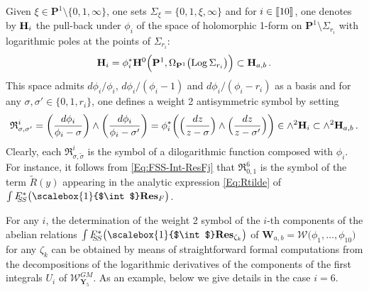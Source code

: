 \documentclass[11pt]{amsart}
\newcommand{\sk}{\smallskip}
\newcommand{\mk}{\medskip}
\begin{document}
Given $\xi\in \mathbf P^1\setminus \{0,1,\infty\}$, one sets $\Sigma_{\xi}=\{0,1,\xi,\infty\}$ and for $i\in  [\hspace{-0.05cm}[ 10  ]\hspace{-0.05cm}]$, 
one denotes by ${\bf H}_{i}$ the pull-back under $\phi_i$ of the space of holomorphic 1-form on $\mathbf P^1\setminus\Sigma_{r_i}$ with logarithmic poles at the points of $\Sigma_{r_i}$: 
$$
{\bf H}_{i}=\phi_i^* 
{\bf H}^0\Big( \mathbf P^1, \Omega_{ \mathbf P^1}\big( {\rm Log}\,\Sigma_{r_i}
 \big) \Big)\subset {\bf H}_{a,b}\, . 
 $$
This space admits ${d\phi_i}/{\phi_i}$, ${d\phi_i}/({\phi_i}-1)$ and 
${d\phi_i}/({\phi_i}-r_i)$ as a basis and for any  $\sigma, \sigma' \in  \{0,1,r_i\} $, one defines a  weight 2 antisymmetric symbol by setting
$$
{\mathfrak R}^i_{\sigma, \sigma'}= \bigg( \frac{d\phi_i}{\phi_i-\sigma}\bigg) \wedge 
\bigg( \frac{d\phi_i}{\phi_i- \sigma'}\bigg)
=\phi_i^*\bigg( \Big( 
 \frac{dz}{z-\sigma}\Big) \wedge 
\Big( \frac{dz}{z- \sigma'}\Big)
\bigg) 
\in \wedge^2 {\bf H}_{i} \subset \wedge^2 {\bf H}_{a,b}
\, .
$$ 
Clearly, each ${\mathfrak R}^i_{\sigma,\tilde \sigma}$ is the symbol of a dilogarithmic function composed with $\phi_i$. For instance, it follows from \eqref{Eq:FSS-Int-ResFj}
 that ${\mathfrak R}^6_{0,1}$ is the symbol of the term $\tilde R(y)$ appearing in the analytic expression \eqref{Eq:Rtilde} of 
$\int F_{\hspace{-0.05cm} 
\hspace{-0.08cm}
S\hspace{-0.03cm}S}^*\big( 
\hspace{-0.0cm}
\scalebox{1}{$\int$}  \hspace{-0.0cm} {\bf Res}_{F}\big)$. \mk

For any $i$, the determination of the weight 2 symbol of 
the $i$-th components of the abelian relations $\int F_{\hspace{-0.05cm} 
\hspace{-0.08cm}
S\hspace{-0.03cm}S}^*\big( 
\hspace{-0.0cm}
\scalebox{1}{$\int$}  \hspace{-0.0cm} {\bf Res}_{\zeta_k}\big)$  of $\boldsymbol{W}_{a,b}=\boldsymbol{\mathcal W}\big(\phi_1,\ldots,\phi_{10}\big)$ 
for any 
$\zeta_k$
can be obtained by means of straightforward formal computations from the decompositions of the logarithmic derivatives of the components of the first integrals $U_{i}$ of $\boldsymbol{\mathcal W}_{\boldsymbol{Y}_5}^{GM}$. 
As an example, below we give details in the case $i=6$. 
\sk
\end{document}
